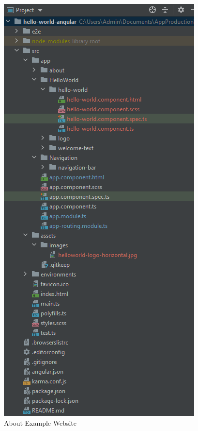 \newpage
\begin{figure}
    \includegraphics[width=0.9\linewidth]{./images/SamplePage_ProjectStructure}
    \caption{About Example Website}
    \label{fig:aboutexamplepage}
\end{figure}
\newline

